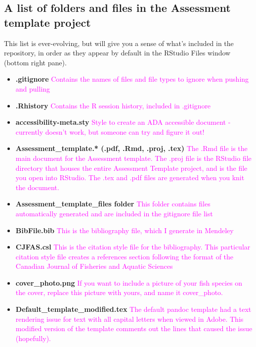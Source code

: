 \documentclass[12pt,]{article}
\begin{document}
\subsection{A list of folders and files in the Assessment template
project}\label{a-list-of-folders-and-files-in-the-assessment-template-project}

This list is ever-evolving, but will give you a sense of what's included
in the repository, in order as they appear by default in the RStudio
Files window (bottom right pane).

\begin{itemize}
\item
  \textbf{.gitignore}
  \textcolor{magenta}{Contains the names of files and file types to ignore when pushing and pulling}
\item
  \textbf{.Rhistory}
  \textcolor{magenta}{Contains the R session history, included in .gitignore}
\item
  \textbf{accessibility-meta.sty}
  \textcolor{magenta}{Style to create an ADA accessible document - currently doesn't work, but someone can try and figure it out!}
\item
  \textbf{Assessment\_template.* (.pdf, .Rmd, .proj, .tex)}
  \textcolor{magenta}{The .Rmd file is the main document for the Assessment template.  The .proj file is the RStudio file directory that houses the entire Assessment Template project, and is the file you open into RStudio.  The .tex and .pdf files are generated when you knit the document.}
\item
  \textbf{Assessment\_template\_files folder}
  \textcolor{magenta}{This folder contains files automatically generated and are included in the gitignore file list}
\item
  \textbf{BibFile.bib}
  \textcolor{magenta}{This is the bibliography file, which I generate in Mendeley}
\item
  \textbf{CJFAS.csl}
  \textcolor{magenta}{This is the citation style file for the bibliography.  This particular citation style file creates a references section following the format of the Canadian Journal of Fisheries and Aquatic Sciences}
\item
  \textbf{cover\_photo.png}
  \textcolor{magenta}{If you want to include a picture of your fish species on the cover, replace this picture with yours, and name it cover\_photo.}
\item
  \textbf{Default\_template\_modified.tex}
  \textcolor{magenta}{The default pandoc template had a text rendering issue for text with all capital letters when viewed in Adobe.  This modified version of the template comments out the lines that caused the issue (hopefully).}

\end{itemize}
\end{document}

